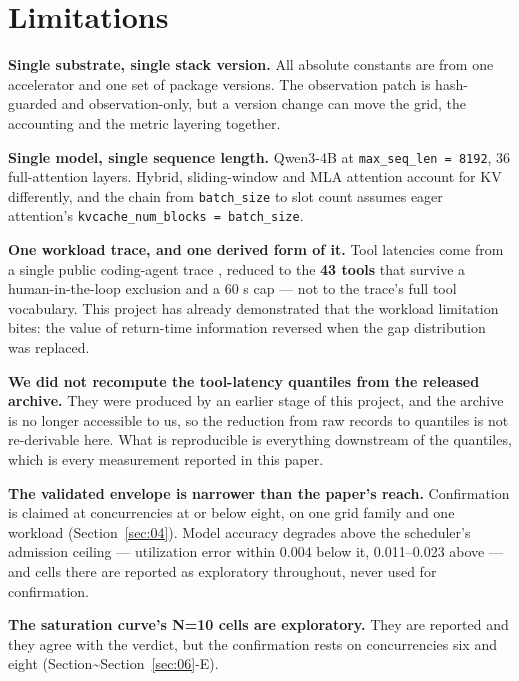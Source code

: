 
\section{Limitations}
\label{sec:09}

\textbf{Single substrate, single stack version.} All absolute constants are from one accelerator and one set of package versions. The observation patch is hash-guarded and observation-only, but a version change can move the grid, the accounting and the metric layering together.

\textbf{Single model, single sequence length.} Qwen3-4B at \texttt{max\_seq\_len = 8192}, 36 full-attention layers. Hybrid, sliding-window and MLA attention account for KV differently, and the chain from \texttt{batch\_size} to slot count assumes eager attention's \texttt{kvcache\_\allowbreak{}num\_\allowbreak{}blocks = batch\_\allowbreak{}size}.

\textbf{One workload trace, and one derived form of it.} Tool latencies come from a single public coding-agent trace \cite{tracelab2026}, reduced to the \textbf{43 tools} that survive a human-in-the-loop exclusion and a 60 s cap --- not to the trace's full tool vocabulary. This project has already demonstrated that the workload limitation bites: the value of return-time information reversed when the gap distribution was replaced.

\textbf{We did not recompute the tool-latency quantiles from the released archive.} They were produced by an earlier stage of this project, and the archive is no longer accessible to us, so the reduction from raw records to quantiles is not re-derivable here. What is reproducible is everything downstream of the quantiles, which is every measurement reported in this paper.

\textbf{The validated envelope is narrower than the paper's reach.} Confirmation is claimed at concurrencies at or below eight, on one grid family and one workload (Section~\ref{sec:04}). Model accuracy degrades above the scheduler's admission ceiling --- utilization error within 0.004 below it, 0.011--0.023 above --- and cells there are reported as exploratory throughout, never used for confirmation.

\textbf{The saturation curve's N=10 cells are exploratory.} They are reported and they agree with the verdict, but the confirmation rests on concurrencies six and eight (Section\textasciitilde{}Section~\ref{sec:06}-E).

